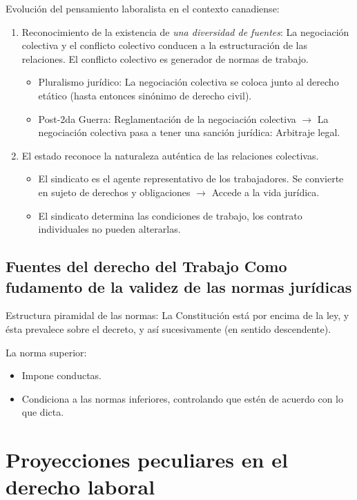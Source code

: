 \documentclass[spanish,12pt,a4paper,titlepage]{report}
\begin{document}
Evolución del pensamiento laboralista en el contexto canadiense:
\begin{enumerate}
\item Reconocimiento de la existencia de \textit{una diversidad de fuentes}: La negociación colectiva y el conflicto colectivo conducen a la estructuración de las relaciones. El conflicto colectivo es generador de normas de trabajo.
  \begin{itemize}
  \item Pluralismo jurídico: La negociación colectiva se coloca junto al derecho etático (hasta entonces sinónimo de derecho civil).
  \item Post-2da Guerra: Reglamentación de la negociación colectiva $\rightarrow$ La negociación colectiva pasa a tener una sanción jurídica: Arbitraje legal.
  \end{itemize}
\item El estado reconoce la naturaleza auténtica de las relaciones colectivas.
  \begin{itemize}
  \item El sindicato es el agente representativo de los trabajadores. Se convierte en sujeto de derechos y obligaciones $\rightarrow$ Accede a la vida jurídica.
  \item El sindicato determina las condiciones de trabajo, los contrato individuales no pueden alterarlas.
  \end{itemize}
\end{enumerate}


\subsection{Fuentes del derecho del Trabajo Como fudamento de la validez de las normas jurídicas}
\label{sec:como-fundamento-de-la-validez-de-las-normas-juridicas}

Estructura piramidal de las normas: La Constitución está por encima de la ley, y ésta prevalece sobre el decreto, y así sucesivamente (en sentido descendente).

La norma superior:
\begin{itemize}
\item Impone conductas.
\item Condiciona a las normas inferiores, controlando que estén de acuerdo con lo que dicta.
\end{itemize}

\section{Proyecciones peculiares en el derecho laboral}
\label{sec:proyecciones-peculiares-en-el-derecho-laboral}
\end{document}
